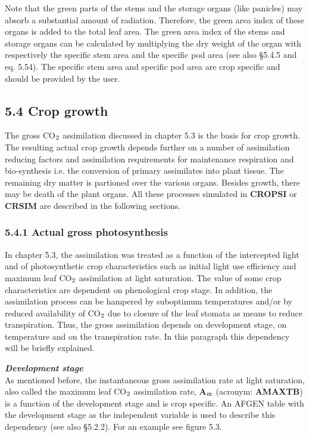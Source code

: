 \documentclass[11pt]{article}
\begin{document}
\bigskip
\bigskip
Note that the green parts of the stems and the storage organs (like panicles) may absorb a
substan\-tial amount of radiation. Therefore, the green area index of these organs is added
to the total leaf area. The green area index of the stems and storage organs can be
calculated by multiplying the dry weight of the organ with respectively the specific stem
area and the specific pod area (see also \S 5.4.5 and eq. 5.54). The specific stem area and
specific pod area are crop specific and should be provided by the user.
\newpage

\subsection{  5.4 Crop growth  }

The gross CO$_{{\rm 2}}$ assimilation discussed in chapter 5.3 is the basis for crop growth. The
resulting actual crop growth depends further on a number of assimilation reducing factors
and assimilation requirements for maintenance respiration and bio-synthesis i.e. the
conversion of primary assimilates into plant tissue. The remaining dry matter is partioned
over the various organs. Besides growth, there may be death of the plant organs. All
these processes simulated in {\bf CROPSI} or {\bf CRSIM} are described in the following sections.

\bigskip
\bigskip

\subsubsection{  5.4.1 Actual gross photosynthesis  }

In chapter 5.3, the assimilation was treated as a function of the intercepted light and of
photosynthetic crop characteristics such as initial light use efficiency and maximum leaf
CO$_{{\rm 2}}$ assimilation at light saturation. The value of some crop characteristics are dependent
on phenological crop stage. In addition, the assimilation process can be hampered by
suboptimum temperatures and/or by reduced availability of CO$_{{\rm 2}}$ due to closure of the leaf
stomata as means to reduce transpiration. Thus, the gross assimila\-tion depends on
development stage, on temperature and on the transpiration rate. In this para\-graph this
dependency will be briefly explained.

\bigskip
{\bf {\it Development stage\/}}\\
As mentioned before, the instantaneous gross assimilation rate at light saturation, also
called the maximum leaf CO$_{{\rm 2}}$ assimilation rate, {\bf A$_{{\rm m}}$} (acronym: {\bf AMAXTB}) is a function of
the development stage and is crop specific. An AFGEN table with the development stage
as the independent variable is used to describe this dependency (see also \S 5.2.2). For an
example see figure 5.3.
\end{document}
